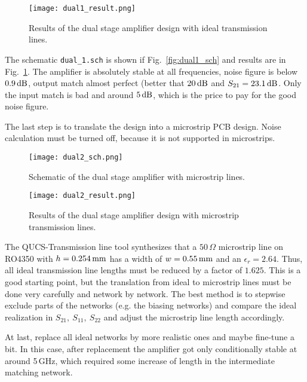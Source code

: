 \begin{figure}
  \centering
  {\texttt{[image: dual1\_result.png]}}
  \caption{Results of the dual stage amplifier design with ideal
    transmission lines.}
  \label{fig:dual1_result}
\end{figure}

The schematic \texttt{dual\_1.sch} is shown if Fig.~\ref{fig:dual1_sch}
and results are in Fig.~\ref{fig:dual1_result}. The amplifier is
absolutely stable at all frequencies, noise figure is below
$0.9\,\mathrm{dB}$, output match almost perfect (better that
$20\,\mathrm{dB}$ and $S_{21}=23.1\,\mathrm{dB}$. Only the input match is
bad and around $5\,\mathrm{dB}$, which is the price to pay for the good
noise figure. 


The last step is to translate the design into a microstrip PCB
design. Noise calculation must be turned off, because it is not
supported in microstrips.

\begin{figure}
  \centering
  {\texttt{[image: dual2\_sch.png]}}
  \caption{Schematic of the dual stage amplifier with microstrip lines.}
  \label{fig:dual2_sch}
\end{figure}

\begin{figure}
  \centering
  {\texttt{[image: dual2\_result.png]}}
  \caption{Results of the dual stage amplifier design with microstrip 
    transmission lines.}
  \label{fig:dual2_result}
\end{figure}


The QUCS-Transmission line tool synthesizes that a $50\,\Omega$
microstrip line on RO4350 with $h=0.254\,\mathrm{mm}$ has a width of
$w=0.55\,\mathrm{mm}$ and an $\epsilon_r=2.64$. Thus, all ideal
transmission line lengths must be reduced by a factor of $1.625$. This
is a good starting point, but the translation from ideal to microstrip
lines must be done very carefully and network by network. The best
method is to stepwise exclude parts of the networks (e.g. the biasing
networks) and compare the ideal realization in $S_{21},\ S_{11},\
S_{22}$ and adjust the microstrip line length accordingly.

At last, replace all ideal networks by more realistic ones and maybe
fine-tune a bit. In this case, after replacement the amplifier got
only conditionally stable at around 5\,GHz, which required some
increase of length in the intermediate matching network. 

